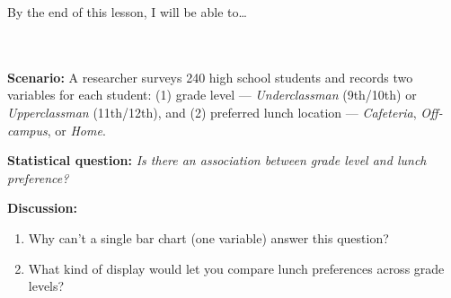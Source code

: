 \documentclass[10pt]{article}
\begin{document}
\namedateperiod

\vspace{0.12in}

\begin{objectivebox}
\small By the end of this lesson, I will be able to\dots\\[4pt]
\writeline\\[1pt]
\writeline\\[1pt]
\writeline
\end{objectivebox}

\vspace{0.1in}

\begin{vocabbox}
\end{vocabbox}

\vspace{0.1in}

\begin{hookbox}
\small\textbf{Scenario:} A researcher surveys 240 high school students and records
two variables for each student: (1) grade level --- \textit{Underclassman} (9th/10th) or
\textit{Upperclassman} (11th/12th), and (2) preferred lunch location ---
\textit{Cafeteria}, \textit{Off-campus}, or \textit{Home}.

\vspace{6pt}
\textbf{Statistical question:} \textit{Is there an association between grade level and
lunch preference?}

\vspace{6pt}
\textbf{Discussion:}
\begin{enumerate}[leftmargin=1.5em, itemsep=2pt]
  \item Why can't a single bar chart (one variable) answer this question?\\
        \writeline

  \item What kind of display would let you compare lunch preferences across grade levels?\\
        \writeline
\end{enumerate}
\end{hookbox}
\end{document}
